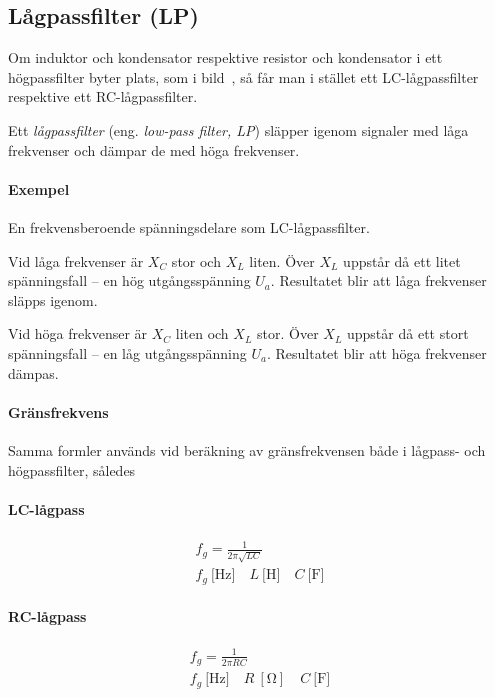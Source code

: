 \subsection{Lågpassfilter (LP)}
\label{lågpassfilter}


Om induktor och kondensator respektive resistor och kondensator i ett
högpassfilter byter plats, som i bild~, så får man i
stället ett LC-lågpassfilter respektive ett RC-lågpassfilter.

Ett \emph{lågpassfilter} (eng. \emph{low-pass filter, LP}) släpper igenom
signaler med låga frekvenser och dämpar de med höga frekvenser.

\paragraph{Exempel} En frekvensberoende spänningsdelare som LC-lågpassfilter.

Vid låga frekvenser är \(X_C\) stor och \(X_L\) liten.
Över \(X_L\) uppstår då ett litet spänningsfall -- en hög utgångsspänning
\(U_a\).
Resultatet blir att låga frekvenser släpps igenom.

Vid höga frekvenser är \(X_C\) liten och \(X_L\) stor.
Över \(X_L\) uppstår då ett stort spänningsfall -- en låg utgångsspänning
\(U_a\).
Resultatet blir att höga frekvenser dämpas.

\paragraph{Gränsfrekvens}

Samma formler används vid beräkning av gränsfrekvensen både i lågpass- och
högpassfilter, således

\paragraph{LC-lågpass}
\begin{gather*}
  f_g = \frac{1}{2\pi \sqrt{LC}} \\
  f_g\ \text{[Hz]} \quad L\ \text{[H]} \quad C\ \text{[F]}
\end{gather*}

\paragraph{RC-lågpass}
\begin{gather*}
  f_g = \frac{1}{2\pi {RC}} \\
  f_g\ \text{[Hz]} \quad R\ [\unit{\ohm}] \quad C\ \text{[F]}
\end{gather*}

